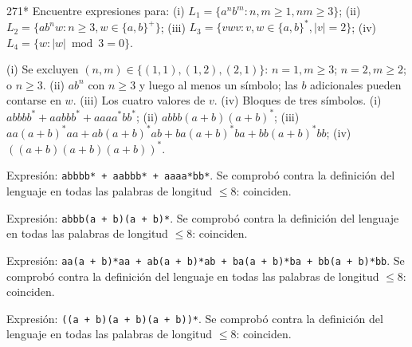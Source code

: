 \documentclass[11pt]{article}
\begin{document}
\begin{ejercicio}{271}{*}
Encuentre expresiones para: (i) $L_1 = \{a^nb^m : n, m \ge 1, nm \ge 3\}$; (ii) $L_2 = \{ab^nw : n \ge 3, w \in \{a, b\}^+\}$; (iii) $L_3 = \{vwv : v, w \in \{a, b\}^*, |v| = 2\}$; (iv) $L_4 = \{w : |w| \bmod 3 = 0\}$.
\end{ejercicio}
\proc (i) Se excluyen $(n, m) \in \{(1,1), (1,2), (2,1)\}$: $n = 1, m \ge 3$; $n = 2, m \ge 2$; o $n \ge 3$. (ii) $ab^n$ con $n \ge 3$ y luego al menos un símbolo; las $b$ adicionales pueden contarse en $w$. (iii) Los cuatro valores de $v$. (iv) Bloques de tres símbolos.
\resp (i) $abbbb^* + aabbb^* + aaaa^*bb^*$; (ii) $abbb(a + b)(a + b)^*$; (iii) $aa(a+b)^*aa + ab(a+b)^*ab + ba(a+b)^*ba + bb(a+b)^*bb$; (iv) $((a + b)(a + b)(a + b))^*$.\par Expresión: \texttt{abbbb* + aabbb* + aaaa*bb*}. Se comprobó contra la definición del lenguaje en todas las palabras de longitud $\le 8$: coinciden.
\par Expresión: \texttt{abbb(a + b)(a + b)*}. Se comprobó contra la definición del lenguaje en todas las palabras de longitud $\le 8$: coinciden.
\par Expresión: \texttt{aa(a + b)*aa + ab(a + b)*ab + ba(a + b)*ba + bb(a + b)*bb}. Se comprobó contra la definición del lenguaje en todas las palabras de longitud $\le 8$: coinciden.
\par Expresión: \texttt{((a + b)(a + b)(a + b))*}. Se comprobó contra la definición del lenguaje en todas las palabras de longitud $\le 8$: coinciden.
\end{document}
